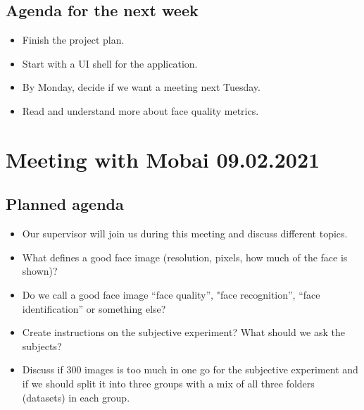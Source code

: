 \subsection*{Agenda for the next week}
\begin{itemize}
    \item Finish the project plan.
    \item Start with a UI shell for the application.
    \item By Monday, decide if we want a meeting next Tuesday.
    \item Read and understand more about face quality metrics.
\end{itemize}


\section*{Meeting with Mobai 09.02.2021}
\subsection*{Planned agenda}
\begin{itemize}
    \item  Our supervisor will join us during this meeting and discuss different topics.
    \item What defines a good face image (resolution, pixels, how much of the face is shown)? 
    \item Do we call a good face image “face quality”, "face recognition”, “face identification” or something else? 
    \item Create instructions on the subjective experiment? What should we ask the subjects?
    \item Discuss if 300 images is too much in one go for the subjective experiment and if we should split it into three groups with a mix of all three folders (datasets) in each group.
\end{itemize}

